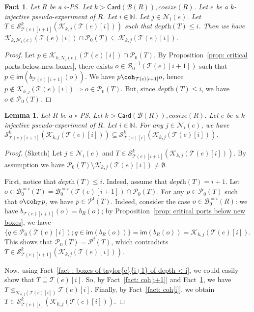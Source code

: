 \documentclass{article}
\theoremstyle{plain}
\newtheorem{lem}[theorem]{Lemma}
\newtheorem{fact}[theorem]{Fact}
\newcommand{\Nat}{\ensuremath{\mathbb{N}}}
\newcommand{\nontrivialconnected}[3]{\mathcal{S}_{#1}^{#3}(#2)}
\newcommand{\taylor}[2]{\mathcal{T}(#1)[#2]}
\newcommand{\criticalports}[3]{\mathcal{K}_{#2, #3}(#1)}
\newcommand{\cosize}[1]{\textit{cosize}(#1)}
\newcommand{\depthof}[1]{\textit{depth}(#1)}
\newcommand{\im}[1]{\textsf{im}(#1)}
\newcommand{\portsatzero}[1]{\mathcal{P}_0(#1)}
\newcommand{\conclusions}[1]{\mathcal{P}^{\textsf{f}}(#1)}
\newcommand{\Card}[1]{\textsf{Card}\left( #1 \right)}
\newcommand{\boxes}[1]{\mathcal{B}(#1)}
\newcommand{\exactboxesatzero}[2]{\mathcal{B}_{0}^{=#2}(#1)}
\begin{document}
\begin{fact}\label{fact: critical ports for M => crtical ports for j}
Let $R$ be a $\circ$-PS. Let $k > \Card{\boxes{R}{}}, \cosize{R}$. 
Let $e$ be a $k$-injective pseudo-experiment of $R$. Let $i \in \Nat$. Let $j \in \mathcal{N}_i(e)$. Let $T \in \nontrivialconnected{\taylor{e}{i+1}}{\criticalports{\taylor{e}{i}}{k}{j}}{k}$ such that $\depthof{T} \leq i$. Then we have $\criticalports{\taylor{e}{i}}{k}{\mathcal{N}_i(e)} \cap \portsatzero{T} \subseteq \criticalports{\taylor{e}{i}}{k}{j}$.
\end{fact}

\begin{proof}
Let $p \in \criticalports{\taylor{e}{i}}{k}{\mathcal{N}_i(e)} \cap \portsatzero{T}$. By Proposition~\ref{prop: critical ports below new boxes}, there exists $o \in \exactboxesatzero{\taylor{e}{i+1}}{i}$ such that $p \in \im{b_{\taylor{e}{i+1}}(o)}$. We have $p \coh_{\taylor{e}{i+1}} o$, hence $p \notin \criticalports{\taylor{e}{i}}{k}{j} \Rightarrow o \in \portsatzero{T}$. But, since $\depthof{T} \leq i$, we have $o \notin \portsatzero{T}$.
\end{proof}

\begin{lem}\label{lem: second condition}
Let $R$ be a $\circ$-PS. Let $k > \Card{\boxes{R}{}}, \cosize{R}$. 
Let $e$ be a $k$-injective pseudo-experiment of $R$. Let $i \in \Nat$. 
For any $j \in  \mathcal{N}_i(e)$, we have $ \nontrivialconnected{\taylor{e}{i+1}}{\criticalports{\taylor{e}{i}}{k}{j}}{k} \subseteq \nontrivialconnected{\taylor{e}{i}}{\criticalports{\taylor{e}{i}}{k}{j}}{k}$.
\end{lem}

\begin{proof}
(Sketch) 
Let $j \in \mathcal{N}_i(e)$ and $T \in \nontrivialconnected{\taylor{e}{i+1}}{\criticalports{\taylor{e}{i}}{k}{j}}{k}$. 
By assumption we have $\portsatzero{T} \setminus \criticalports{\taylor{e}{i}}{k}{j} \not= \emptyset$.

First, notice that $\depthof{T} \leq i$. Indeed, assume that $\depthof{T} = i+1$. Let $o \in \exactboxesatzero{T}{i} = \exactboxesatzero{\taylor{e}{i+1}}{i} \cap \portsatzero{T}$. For any $p \in \portsatzero{T}$ such that $o \coh_T p$, we have $p \in \conclusions{T}$. Indeed, consider the case $o \in \exactboxesatzero{R}{i}$: we have $b_{\taylor{e}{i+1}}(o) = b_R(o)$; by Proposition~\ref{prop: critical ports below new boxes}, we have $\{ q \in \portsatzero{\taylor{e}{i}} ; q \in \im{b_R(o)} \} = \im{b_R(o)} = \criticalports{\taylor{e}{i}}{k}{j}$. This shows that $\portsatzero{T} = \conclusions{T}$, which contradicts $T \in \nontrivialconnected{\taylor{e}{i+1}}{\criticalports{\taylor{e}{i}}{k}{j}}{k}$. 

Now, using Fact~\ref{fact : boxes of taylor{e}{i+1} of depth < i}, we could easily show that $T \sqsubseteq \taylor{e}{i}$. 
So, by Fact~\ref{fact: coh[i+1]} and Fact~\ref{fact: critical ports for M => crtical ports for j}, we have $T \trianglelefteq_{\criticalports{\taylor{e}{i}}{k}{j}} \taylor{e}{i}$. 
Finally, by Fact~\ref{fact: coh[i]}, we obtain $T \in \nontrivialconnected{\taylor{e}{i}}{\criticalports{\taylor{e}{i}}{k}{j}}{k}$.
\end{proof}
\end{document}
